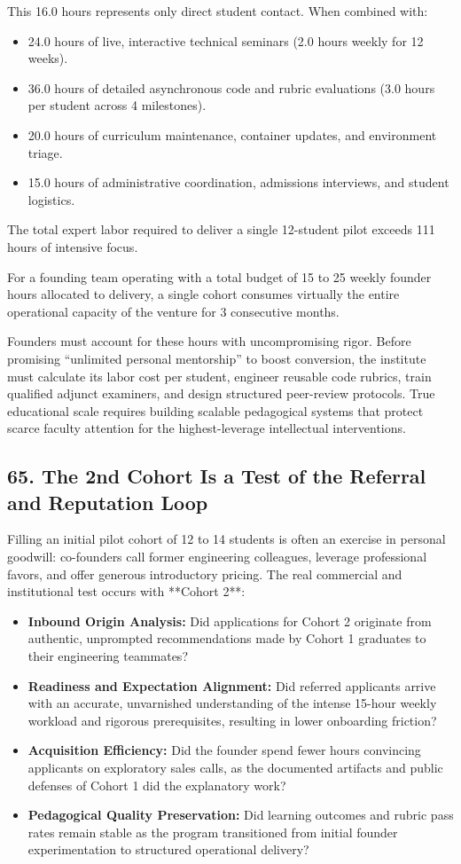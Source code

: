 This 16.0 hours represents only direct student contact. When combined with:
\begin{itemize}[leftmargin=*]
\item 24.0 hours of live, interactive technical seminars (2.0 hours weekly for 12 weeks).
\item 36.0 hours of detailed asynchronous code and rubric evaluations (3.0 hours per student across 4 milestones).
\item 20.0 hours of curriculum maintenance, container updates, and environment triage.
\item 15.0 hours of administrative coordination, admissions interviews, and student logistics.
\end{itemize}
The total expert labor required to deliver a single 12-student pilot exceeds 111 hours of intensive focus. 

For a founding team operating with a total budget of 15 to 25 weekly founder hours allocated to delivery, a single cohort consumes virtually the entire operational capacity of the venture for 3 consecutive months. 

Founders must account for these hours with uncompromising rigor. Before promising ``unlimited personal mentorship'' to boost conversion, the institute must calculate its labor cost per student, engineer reusable code rubrics, train qualified adjunct examiners, and design structured peer-review protocols. True educational scale requires building scalable pedagogical systems that protect scarce faculty attention for the highest-leverage intellectual interventions.

\subsection*{65. The 2nd Cohort Is a Test of the Referral and Reputation Loop}

Filling an initial pilot cohort of 12 to 14 students is often an exercise in personal goodwill: co-founders call former engineering colleagues, leverage professional favors, and offer generous introductory pricing. The real commercial and institutional test occurs with **Cohort 2**:
\begin{itemize}[leftmargin=*]
\item \textbf{Inbound Origin Analysis:} Did applications for Cohort 2 originate from authentic, unprompted recommendations made by Cohort 1 graduates to their engineering teammates?
\item \textbf{Readiness and Expectation Alignment:} Did referred applicants arrive with an accurate, unvarnished understanding of the intense 15-hour weekly workload and rigorous prerequisites, resulting in lower onboarding friction?
\item \textbf{Acquisition Efficiency:} Did the founder spend fewer hours convincing applicants on exploratory sales calls, as the documented artifacts and public defenses of Cohort 1 did the explanatory work?
\item \textbf{Pedagogical Quality Preservation:} Did learning outcomes and rubric pass rates remain stable as the program transitioned from initial founder experimentation to structured operational delivery?
\end{itemize}

